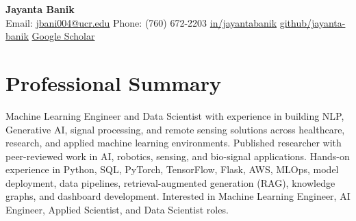 \documentclass[10pt,letterpaper]{article}
\begin{document}
{\LARGE \textbf{Jayanta Banik}}\\

Email: \href{mailto:jbani004@ucr.edu}{jbani004@ucr.edu} \quad
Phone: (760) 672-2203 \quad
\href{https://www.linkedin.com/in/jayantabanik}{in/jayantabanik} \quad
\href{https://github.com/jayanta-banik}{github/jayanta-banik} \quad
\href{https://scholar.google.com/citations?user=t_7gaZQAAAAJ&hl=en}{Google Scholar}

\section*{Professional Summary}
Machine Learning Engineer and Data Scientist with experience in building NLP, Generative AI, signal processing, and remote sensing solutions across healthcare, research, and applied machine learning environments. Published researcher with peer-reviewed work in AI, robotics, sensing, and bio-signal applications. Hands-on experience in Python, SQL, PyTorch, TensorFlow, Flask, AWS, MLOps, model deployment, data pipelines, retrieval-augmented generation (RAG), knowledge graphs, and dashboard development. Interested in Machine Learning Engineer, AI Engineer, Applied Scientist, and Data Scientist roles.
\end{document}
